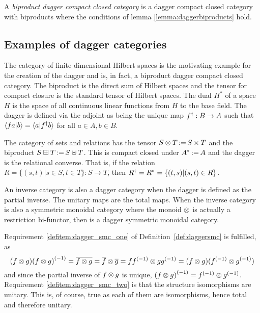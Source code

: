 \begin{definition} \label{def:biproductdaggerccc}
  A \emph{biproduct dagger compact closed category} is a dagger compact closed category with
  biproducts where the conditions of lemma \ref{lemma:daggerbiproducts} hold.
\end{definition}
\subsection{Examples of dagger categories}

\begin{example}[\fdh]\label{ex:fdhilbert_is_dagger_category}
The category of finite dimensional Hilbert spaces is the motivating example for
the creation of the dagger and is, in fact, a biproduct dagger compact closed category. The
biproduct is the direct sum of Hilbert spaces and the tensor for compact closure is the standard
tensor of Hilbert spaces. The dual $H^{*}$ of a space $H$ is the space of all continuous linear
functions from $H$ to the base field. The dagger is defined via the adjoint as being the unique map
${f}^{\dagger}:B\to A$ such that $\langle f a|b\rangle = \langle a | {f}^{\dagger} b\rangle$ for all $a\in A, b\in B$.
\end{example}

\begin{example}[\rel]\label{ex:rel_is_dagger_category}
The category \rel of sets and relations has the tensor $S\otimes T \operatorname*{:\!=} S\times T$ and the biproduct
$S\boxplus T \operatorname*{:\!=} S\uplus T$. This is compact closed under $A^{*} \operatorname*{:\!=} A$ and
the dagger is the relational converse. That is, if the relation
$R=\{(s,t)|s\in S, t\in T\}:S\to T$, then ${R}^{\dagger}=R^*=\{(t,s)|(s,t)\in R\}$.
\end{example}

\begin{example}\label{ex:inverse_category_is_dagger_category}
An inverse category \X is also a dagger category when the dagger is defined as the partial inverse.
The unitary maps are the total maps. When the inverse category \X is also a
symmetric monoidal category where the monoid $\otimes$ is actually a restriction bi-functor, then \X is
a dagger symmetric monoidal category.

Requirement \ref{defitem:dagger_smc_one} of Definition~\ref{def:daggersmc}  is fulfilled, as
\[
  (f\otimes g) {(f\otimes g)}^{(-1)} = \overline{f\otimes g}=\overline{f} \otimes\overline{g} =
   f{f}^{(-1)} \otimes g {g}^{(-1)} = (f\otimes g) ({f}^{(-1)} \otimes {g}^{(-1)})
\]
and since the partial inverse of $f\otimes g$ is unique, ${(f\otimes g)}^{(-1)} = {f}^{(-1)} \otimes {g}^{(-1)}$.
Requirement \ref{defitem:dagger_smc_two} is that the structure isomorphisms are unitary. This is, of
course, true as each of them are isomorphisms, hence total and therefore unitary.
\end{example}
